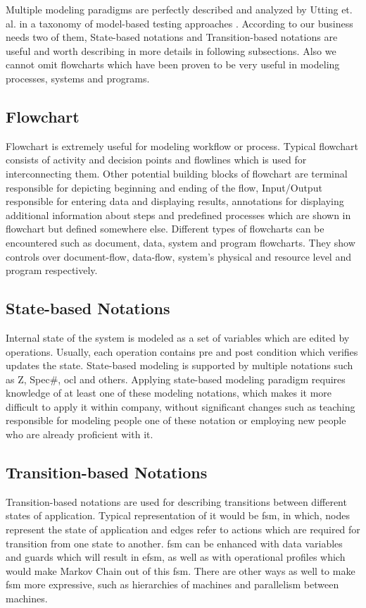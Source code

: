 Multiple modeling paradigms are perfectly described and analyzed by Utting et. al. in a taxonomy of model-based testing approaches \cite{Pretschner_Taxonomy}. According to our business needs two of them, State-based notations and Transition-based notations are useful and worth describing in more details in following subsections. Also we cannot omit flowcharts which have been proven to be very useful in modeling processes, systems and programs. 

\subsection{Flowchart}
\par
Flowchart \cite{Flowchart} is extremely useful for modeling workflow or process. Typical flowchart consists of activity and decision points and flowlines which is used for interconnecting them. Other potential building blocks of flowchart are terminal responsible for depicting beginning and ending of the flow, Input/Output responsible for entering data and displaying results, annotations for displaying additional information about steps and predefined processes which are shown in flowchart but defined somewhere else. Different types of flowcharts can be encountered such as document, data, system and program flowcharts. They show controls over document-flow, data-flow, system's physical and resource level and program respectively.

\subsection{State-based Notations}
\par
Internal state of the system is modeled as a set of variables which are edited by operations. Usually, each operation contains pre and post condition which verifies updates the state.\cite{Pretschner_Taxonomy} State-based modeling is supported by multiple notations such as Z, Spec\#, \acrshort{ocl} and others. Applying state-based modeling paradigm requires knowledge of at least one of these modeling notations, which makes it more difficult to apply it within company, without significant changes such as teaching responsible for modeling people one of these notation or employing new people who are already proficient with it. 

\subsection{Transition-based Notations}
\par
Transition-based notations are used for describing transitions between different states of application. Typical representation of it would be \acrshort{fsm}, in which, nodes represent the state of application and edges refer to actions which are required for transition from one state to another. \acrshort{fsm} can be enhanced with data variables and guards which will result in \acrshort{efsm}, as well as with operational profiles which would make Markov Chain out of this \acrshort{fsm}. There are other ways as well to make \acrshort{fsm} more expressive, such as hierarchies of machines and parallelism between machines\cite{Pretschner_Taxonomy}.

